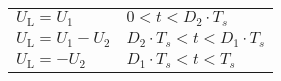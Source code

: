 \begin{table}[ht]
    \centering  %
    \begin{tabular}{ll}
        \toprule
        $U_\mathrm{L} = U_\mathrm{1}$ & $0<t<D_2 \cdot T_s$ \\
        $U_\mathrm{L} = U_\mathrm{1}-U_\mathrm{2}$ & $D_2 \cdot T_s <t<D_1 \cdot T_s$ \\
        $U_\mathrm{L} = -U_\mathrm{2}$ & $D_1 \cdot T_s<t<T_s$ \\
        \bottomrule
    \end{tabular}
\end{table}